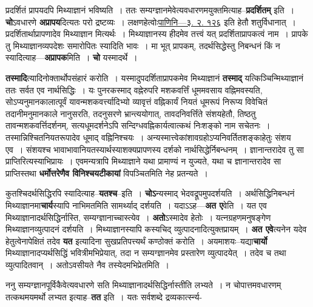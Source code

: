 \documentclass[article,12pt,a4paper]{memoir}
\begin{document}
	  \pstart प्रदर्शितं प्रापयदपि मिथ्याज्ञानं भविष्यति । ततः सम्यग्ज्ञानमेवेत्यवधारणमयुक्तमित्याह--\textbf{प्रदर्शितम्} इति । \textbf{चो}ऽवधारणे \textbf{अप्रापय}दित्यतः परो द्रष्टव्यः । लक्षणहेत्वोः\href{http://sarit.indology.info/?cref=Pā.3.2.126}{पाणिनि—३. २. १२६} इति हेतौ शतुर्विधानात् । प्रदर्शितार्थाप्रापणादेव मिथ्याज्ञान \leavevmode{} मित्यर्थः । मिथ्याज्ञानस्य हीदमेव तत्त्वं यत् प्रदर्शिताप्रापकत्वं नाम । प्रापके तु मिथ्याज्ञानव्यपदेशः समारोपितः स्यादिति भावः । मा भूत् प्रापकम्, तदर्थसिद्धेस्तु निबन्धनं किं न स्यादित्याह—\textbf{अप्रापक}मिति । \textbf{चो} यस्मादर्थे ।
	\pend
      

	  \pstart \textbf{तस्मादि}त्यादिनोक्तार्थोपसंहारं करोति । यस्मादुपदर्शिताप्रापकमेव मिथ्याज्ञानं \textbf{तस्माद्} यत्किञ्चिन्मिथ्याज्ञानं ततः सर्वत एव नार्थसिद्धिः । यः पुनरकस्माद् वह्नेरुपरि मशकवर्त्तिं धूममवसाय वह्निमवस्यति, सोऽप्यनुमानकालात्पूर्वं यावन्मशकवर्त्त्यादिभ्यो व्यावृत्तं वह्निकार्यं नियतं धूमरूपं निरूप्य विवेचितं तदानीमनुमानकाले नानुसरति, तदनुसरणे भ्रान्त्ययोगात्, तावदनिवर्त्तिंते संशयहेतौ, तिष्ठतु तावन्मशकवर्त्तिदर्शनम्, सत्यधूमदर्शनेऽपि सन्दिग्धवह्निकार्यत्वात्कथं निःशङ्को नाम सचेतनः । तस्मान्निश्चितनियतरूपादेव धूमाद् वह्निनिश्चयः । अन्यस्मात्त्वेकांशावग्रहोऽप्यनिवर्तितशङ्काहेतुः संशय एव । संशयश्च भावाभावानियतस्यार्थस्याशक्यप्रापणस्य दर्शको नार्थसिद्धेर्निबन्धनम् । ज्ञानान्तरादेव तु सा प्राप्तिरित्यस्याभिप्रायः । एवमन्यत्रापि मिथ्याज्ञाने यथा प्रामाण्यं न युज्यते, यथा च ज्ञानान्तरादेव सा प्राप्तिस्तथा \textbf{धर्मोत्तरेणैव विनिश्चयटीकायां} विपञ्चितमिति नेह प्रतन्यते ।
	\pend
      

	  \pstart कुतश्चिदर्थसिद्धिरपि स्यादित्याह--\textbf{यतश्च}--इति । \textbf{चोऽ}न्यस्माद् भेदवद्रूपमुपदर्शयति । अर्थसिद्धिनिबन्धनं मिथ्याज्ञानमा\textbf{चार्य}स्यापि नाभिमतमिति सामर्थ्याद् दर्शयति । यदाऽऽह—\textbf{अत ए}वेति । यत एव मिथ्याज्ञानादर्थसिद्धिर्नास्ति, सम्यग्ज्ञानाच्चास्त्येव । \textbf{अतो}ऽस्मादेव हेतोः । यत्नग्रहणमनुषङ्गेण मिथ्याज्ञानव्युत्पादनं दर्शयति । मिथ्याज्ञानस्यापि कस्यचिद् व्युत्पादनादित्युक्तप्रायम् । \textbf{अत एवे}त्यनेन यदेव हेतुत्वेनापेक्षितं तदेव \textbf{यत} इत्यादिना सुखप्रतिपत्त्यर्थं कण्ठोक्तं करोति । अयमाशयः--यद्या\textbf{चार्यो} मिथ्याज्ञानादप्यर्थसिद्धिं भवित्रीमभिप्रेयात्, तदा न सम्यग्ज्ञानमेव प्रस्तारेण व्युत्पादयेत् । तदेव च तथा व्युत्पादितवान् । अतोऽवसीयते नैव तस्येदमभिप्रेतमिति ।
	\pend
      

	  \pstart ननु सम्यग्ज्ञानपूर्विकैवेत्यवधारणे सति मिथ्याज्ञानादर्थसिद्धिर्नास्तीति लभ्यते । न चोपात्तमवधारणम् तत्कथमयमर्थो लभ्यत इत्याह--\textbf{तत} इति । यतः सर्वशब्दे द्रव्यकार्त्स्न्य- \leavevmode{} 
	  
\end{document}
